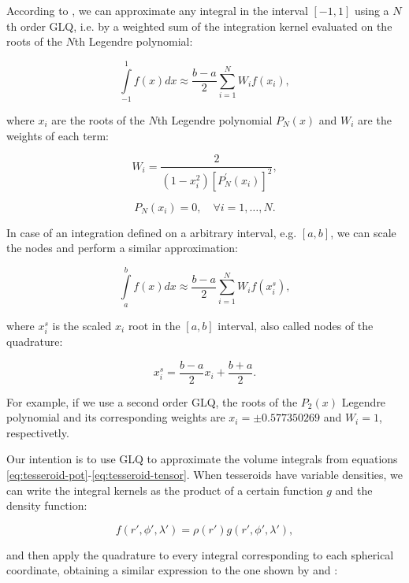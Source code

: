 \documentclass[extra]{gji}
\begin{document}
According to \citet[p.~390]{Hildebrand1987}, we can approximate any integral in the interval $[-1, 1]$ using a $N$th order GLQ, i.e. by a weighted sum of the integration kernel evaluated on the roots of the $N$th Legendre polynomial:

\begin{equation}
    \int\limits_{-1}^1 f(x) dx \approx \frac{b-a}{2} \sum_{i=1}^N W_i f(x_i),
\end{equation}

\noindent where $x_i$ are the roots of the $N$th Legendre polynomial $P_N(x)$ and $W_i$ are the weights of each term:

\begin{equation}
    W_i = \frac{2}{(1-x_i^2)[P_N^\prime(x_i)]^2},
\end{equation}

\begin{equation}
    P_N(x_i) = 0, \quad \forall i = {1,\dots,N}.
\end{equation}

In case of an integration defined on a arbitrary interval, e.g. $[a,b]$, we can scale the nodes and perform a similar approximation:

\begin{equation}
    \int\limits_a^b f(x) dx \approx \frac{b-a}{2} \sum_{i=1}^N W_i f(x_i^s),
\end{equation}

\noindent where $x_i^s$ is the scaled $x_i$ root in the $[a,b]$ interval, also called nodes of the quadrature:

\begin{equation}
    x_i^s = \frac{b-a}{2} x_i + \frac{b+a}{2}.
\end{equation}

For example, if we use a second order GLQ, the roots of the $P_2(x)$ Legendre polynomial and its corresponding weights are $x_i = \pm 0.577350269$ and $W_i = 1$, respectivetly.

Our intention is to use GLQ to approximate the volume integrals from equations \ref{eq:tesseroid-pot}-\ref{eq:tesseroid-tensor}. 
When tesseroids have variable densities, we can write the integral kernels as the product of a certain function $g$ and the density function:

\begin{equation}
    f(r', \phi', \lambda') = \rho(r') g(r', \phi', \lambda'),
\end{equation}

\noindent and then apply the quadrature to every integral corresponding to each spherical coordinate, obtaining a similar expression to the one shown by \citet{Asgharzadeh2007} and \citet{Uieda2016}:
\end{document}

